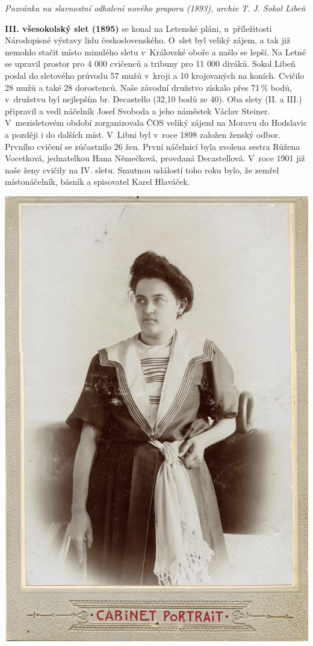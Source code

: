 \documentclass[a5paper, 11pt, twoside]{article}
\begin{document}
\textit{Pozvánka na slavnostní odhalení nového praporu (1893), archiv T. J. Sokol Libeň}

\textbf{III. všesokolský slet (1895)} se konal na Letenské pláni, u~příležitosti Národopisné výstavy lidu československého. O~slet byl veliký zájem, a tak již nemohlo stačit místo minulého sletu v~Královské oboře a našlo se lepší. Na Letné se upravil prostor pro 4 000 cvičenců a tribuny pro 11 000 diváků. Sokol Libeň poslal do sletového průvodu 57 mužů v~kroji a 10 krojovaných na koních. Cvičilo 28 mužů a také 28 dorostenců. Naše závodní družstvo získalo přes 71\,\% bodů, v~družstvu byl nejlepším br. Decastello (32,10 bodů ze 40). Oba slety (II. a III.) připravil a vedl náčelník Josef Svoboda a jeho náměstek Václav Steiner. V~mezisletovém období zorganizovala ČOS veliký zájezd na Moravu do Hodslavic a později i do dalších míst. V~Libni byl v~roce 1898 založen ženský odbor. Prvního cvičení se zúčastnilo 26 žen. První náčelnicí byla zvolena sestra Růžena Vocetková, jednatelkou Hana Němečková, provdaná Decastellová. V~roce 1901 již naše ženy cvičily na IV. sletu. Smutnou událostí toho roku bylo, že zemřel místonáčelník, básník a spisovatel Karel Hlaváček.

\includegraphics[width=\textwidth]{img/11_hana_decastellova.jpg}
\end{document}
